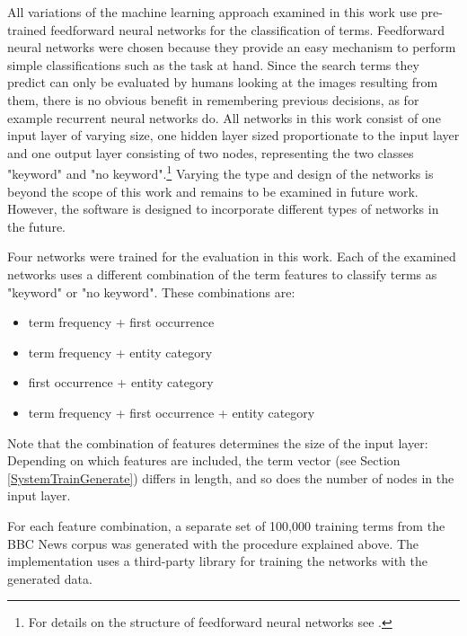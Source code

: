 \documentclass[11pt,a4paper,twoside]{article}
\begin{document}
\noindent All variations of the machine learning approach examined in this work use pre-trained feedforward neural networks for the classification of terms. Feedforward neural networks were chosen because they provide an easy mechanism to perform simple classifications such as the task at hand. Since the search terms they predict can only be evaluated by humans looking at the images resulting from them, there is no obvious benefit in remembering previous decisions, as for example recurrent neural networks do. All networks in this work consist of one input layer of varying size, one hidden layer sized proportionate to the input layer and one output layer consisting of two nodes, representing the two classes "keyword" and "no keyword".\footnote{For details on the structure of feedforward neural networks see \cite{Bishop1995NeuralRecognition}.} Varying the type and design of the networks is beyond the scope of this work and remains to be examined in future work. However, the software is designed to incorporate different types of networks in the future.

Four networks were trained for the evaluation in this work. Each of the examined networks uses a different combination of the term features to classify terms as "keyword" or "no keyword". These combinations are:

\vspace{-.5em}
\begin{itemize}
    \setlength\itemsep{0em}
    \item term frequency + first occurrence
    \item term frequency + entity category
    \item first occurrence + entity category
    \item term frequency + first occurrence + entity category
\end{itemize}
\vspace{-.5em}

\noindent Note that the combination of features determines the size of the input layer: Depending on which features are included, the term vector (see Section \ref{SystemTrainGenerate}) differs in length, and so does the number of nodes in the input layer.

For each feature combination, a separate set of 100,000 training terms from the BBC News corpus was generated with the procedure explained above. The implementation uses a third-party library \cite{BrainJSBrain.js:JavaScript} for training the networks with the generated data.
\end{document}
